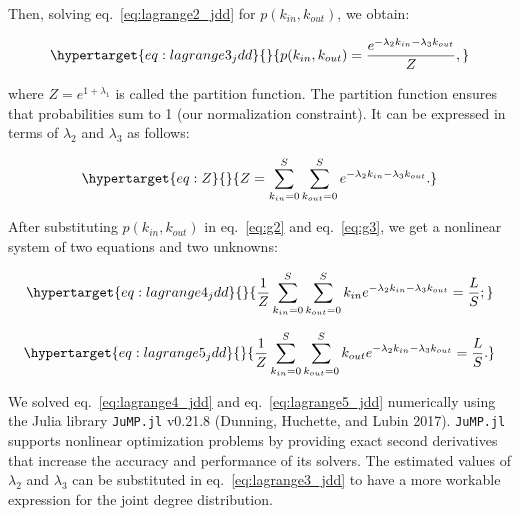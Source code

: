 \documentclass[11pt]{article}
\begin{document}
Then, solving eq.~\ref{eq:lagrange2_jdd} for \(p(k_{in},k_{out})\), we
obtain:

\begin{equation}\protect\hypertarget{eq:lagrange3_jdd}{}{p(k_{in},k_{out}) = \frac{e^{-\lambda_2k_{in}-\lambda_3k_{out}}}{Z},}\label{eq:lagrange3_jdd}\end{equation}

where \(Z = e^{1+\lambda_1}\) is called the partition function. The
partition function ensures that probabilities sum to 1 (our
normalization constraint). It can be expressed in terms of \(\lambda_2\)
and \(\lambda_3\) as follows:

\begin{equation}\protect\hypertarget{eq:Z}{}{Z = \sum_{k_{in}=0}^S\sum_{k_{out}=0}^S e^{-\lambda_2k_{in}-\lambda_3k_{out}}.}\label{eq:Z}\end{equation}

After substituting \(p(k_{in},k_{out})\) in eq.~\ref{eq:g2} and
eq.~\ref{eq:g3}, we get a nonlinear system of two equations and two
unknowns:

\begin{equation}\protect\hypertarget{eq:lagrange4_jdd}{}{\frac{1}{Z}\sum_{k_{in}=0}^S\sum_{k_{out}=0}^S k_{in} e^{-\lambda_2k_{in}-\lambda_3k_{out}}  = \frac{L}{S};}\label{eq:lagrange4_jdd}\end{equation}

\begin{equation}\protect\hypertarget{eq:lagrange5_jdd}{}{\frac{1}{Z}\sum_{k_{in}=0}^S\sum_{k_{out}=0}^S k_{out} e^{-\lambda_2k_{in}-\lambda_3k_{out}}  = \frac{L}{S}.}\label{eq:lagrange5_jdd}\end{equation}

We solved eq.~\ref{eq:lagrange4_jdd} and eq.~\ref{eq:lagrange5_jdd}
numerically using the Julia library \texttt{JuMP.jl} v0.21.8 (Dunning,
Huchette, and Lubin 2017). \texttt{JuMP.jl} supports nonlinear
optimization problems by providing exact second derivatives that
increase the accuracy and performance of its solvers. The estimated
values of \(\lambda_2\) and \(\lambda_3\) can be substituted in
eq.~\ref{eq:lagrange3_jdd} to have a more workable expression for the
joint degree distribution.
\end{document}
